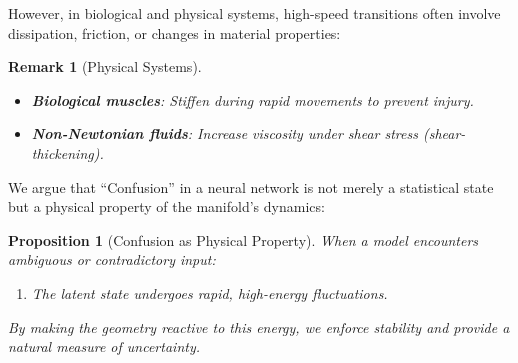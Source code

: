 \documentclass[12pt,letterpaper,twoside]{article}
\newtheorem{remarque}{Remark}[section]
\newtheorem{prop}{Proposition}[section]
\begin{document}
However, in biological and physical systems, high-speed transitions often involve dissipation, friction, or changes in material properties:

\begin{remarque}[Physical Systems]
\begin{itemize}
\item \textbf{Biological muscles}: Stiffen during rapid movements to prevent injury.
\item \textbf{Non-Newtonian fluids}: Increase viscosity under shear stress (shear-thickening).
\end{itemize}
\end{remarque}

We argue that ``Confusion'' in a neural network is not merely a statistical state but a physical property of the manifold's dynamics:

\begin{prop}[Confusion as Physical Property]
When a model encounters ambiguous or contradictory input:
\begin{enumerate}
\item The latent state undergoes rapid, high-energy fluctuations.
\end{enumerate}
By making the geometry reactive to this energy, we enforce stability and provide a natural measure of uncertainty.
\end{prop}
\end{document}
